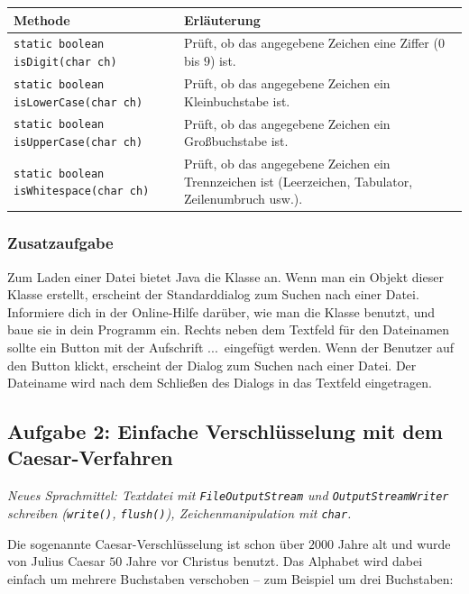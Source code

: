 \medskip
\bgroup
\def\arraystretch{1.2}
\begin{tabularx}{\textwidth}{|p{70mm}|X|}
\hline
\textbf{Methode} & \textbf{Erläuterung}
\\ \hline
\texttt{static boolean isDigit(char ch)} & 
Prüft, ob das angegebene Zeichen eine Ziffer ($0$ bis $9$) ist.
\\ \hline
\texttt{static boolean isLowerCase(char ch)} &
Prüft, ob das angegebene Zeichen ein Kleinbuchstabe ist. 
\\ \hline
\texttt{static boolean isUpperCase(char ch)} &
Prüft, ob das angegebene Zeichen ein Großbuchstabe ist. 
\\ \hline
\texttt{static boolean isWhitespace(char ch)} &
Prüft, ob das angegebene Zeichen ein Trennzeichen ist (Leerzeichen,
Tabulator, Zeilenumbruch usw.).
\\ \hline
\end{tabularx}
\egroup

\subsubsection{Zusatzaufgabe \tagZusatz \tagLK}

Zum Laden einer Datei bietet Java die Klasse  an. Wenn man
ein Objekt dieser Klasse erstellt, erscheint der Standarddialog zum Suchen nach
einer Datei. Informiere dich in der Online-Hilfe darüber, wie man die Klasse
 benutzt, und baue sie in dein Programm ein. Rechts neben
dem Textfeld für den Dateinamen sollte ein Button mit der Aufschrift
\glqq ...\grqq\ eingefügt werden. Wenn der Benutzer auf den Button klickt,
erscheint der Dialog zum Suchen nach einer Datei. Der Dateiname wird nach dem
Schließen des Dialogs in das Textfeld eingetragen.


\subsection{Aufgabe 2: Einfache Verschlüsselung mit dem Caesar-Verfahren \tagZusatz \tagLK}
\noindent \emph{Neues Sprachmittel: Textdatei mit \texttt{FileOutputStream} und \texttt{OutputStreamWriter} schreiben (\texttt{write()}, \texttt{flush()}), Zeichenmanipulation mit \texttt{char}.}

Die sogenannte Caesar-Verschlüsselung ist schon über $2000$ Jahre alt und wurde von
Julius Caesar $50$ Jahre vor Christus benutzt. Das Alphabet wird dabei einfach um
mehrere Buchstaben verschoben -- zum Beispiel um drei Buchstaben:

